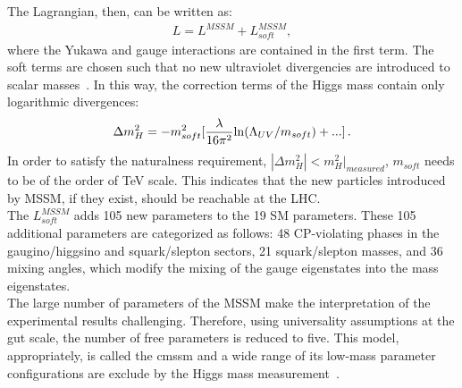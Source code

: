 The Lagrangian, then, can be written as:
\begin{eqnarray}
\label{Lsusy}
{L = L^{MSSM}+L^{MSSM}_{soft}},
\end{eqnarray}
where the Yukawa and gauge interactions are contained in the first term. The soft terms are chosen such that no new ultraviolet divergencies are introduced to scalar masses~\cite{susy_fromRobert}.
In this way, the correction terms of the Higgs mass contain only logarithmic divergences:
\begin{eqnarray}
\label{deltaH3}
{\Delta m_H^2 = -m^2_{soft}[ \frac{\lambda}{16\pi^2}{\rm ln} (\Lambda_{UV}/m_{soft})+...]}\, .
\end{eqnarray}
In order to satisfy the naturalness requirement, $| \Delta m_H^2| < m_H^2|_{measured}$, $m_{soft}$ needs to be of the order of TeV scale. This indicates that the new particles introduced by MSSM, if they exist, should be reachable at the LHC. \\
The $L^{MSSM}_{soft}$ adds 105 new parameters to the 19 SM parameters. These 105 additional parameters are categorized as follows: 48 CP-violating phases in the gaugino/higgsino and squark/slepton sectors, 21 squark/slepton masses, and 36 mixing angles, which modify the mixing of the gauge eigenstates into the mass eigenstates.\\
The large number of parameters of the MSSM make the interpretation of the experimental results challenging. Therefore, using universality assumptions at the \acrshort{gut} scale, the number of free parameters is reduced to five. This model, appropriately, is called the \acrfull{cmssm} and a wide range of its low-mass parameter configurations are exclude by the Higgs mass measurement~\cite{ellis}. 
